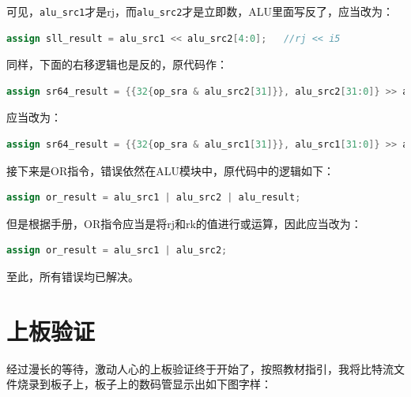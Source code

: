 \documentclass[UTF8]{article}
\begin{document}
\begin{enumerate}
    可见，\texttt{alu\_src1}才是rj，而\texttt{alu\_src2}才是立即数，ALU里面写反了，应当改为：

    \begin{lstlisting}[language=Verilog]
        assign sll_result = alu_src1 << alu_src2[4:0];   //rj << i5
    \end{lstlisting}

    同样，下面的右移逻辑也是反的，原代码作：

    \begin{lstlisting}[language=Verilog]
        assign sr64_result = {{32{op_sra & alu_src2[31]}}, alu_src2[31:0]} >> alu_src1[4:0]; //rj >> i5
    \end{lstlisting}

    应当改为：

    \begin{lstlisting}[language=Verilog]
        assign sr64_result = {{32{op_sra & alu_src1[31]}}, alu_src1[31:0]} >> alu_src2[4:0]; //rj >> i5
    \end{lstlisting}

    接下来是OR指令，错误依然在ALU模块中，原代码中的逻辑如下：

    \begin{lstlisting}[language=Verilog]
        assign or_result = alu_src1 | alu_src2 | alu_result;
    \end{lstlisting}

    但是根据手册，OR指令应当是将rj和rk的值进行或运算，因此应当改为：

    \begin{lstlisting}[language=Verilog]
        assign or_result = alu_src1 | alu_src2;
    \end{lstlisting}

    至此，所有错误均已解决。
\end{enumerate}

\section{上板验证}

经过漫长的等待，激动人心的上板验证终于开始了，按照教材指引，我将比特流文件烧录到板子上，板子上的数码管显示出如下图字样：
\end{document}
